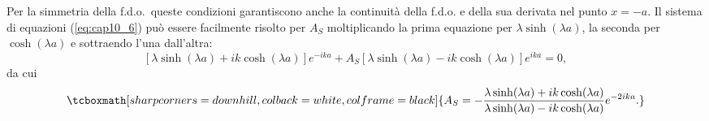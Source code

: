 \documentclass[a4paper,12pt,oneside]{book}
\begin{document}
Per la simmetria della f.d.o.~queste condizioni garantiscono anche la continuità della f.d.o. e della sua derivata nel punto $x=-a$. Il sistema di equazioni (\ref{eq:cap10_6}) può essere facilmente risolto per $A_S$ moltiplicando la prima equazione per $\lambda \sinh (\lambda a)$, la seconda per $\cosh (\lambda a)$ e sottraendo l'una dall'altra:
	\begin{equation}
		\left[\lambda \sinh (\lambda a)+ ik\cosh (\lambda a) \right]e^{-ika}+ A_S \left[\lambda \sinh (\lambda a)-ik \cosh (\lambda a) \right]e^{ika}=0,
	\end{equation}
da cui
	\begin{equation}
		\tcboxmath[sharp corners=downhill, colback=white, colframe=black]{	
			A_S=-\frac{\lambda \sinh (\lambda a)+ik \cosh (\lambda a)}{\lambda \sinh (\lambda a)-ik \cosh (\lambda a)}e^{-2ika}.
			}
	\label{eq:cap10_7}
	\end{equation}\\
	
\end{document}
